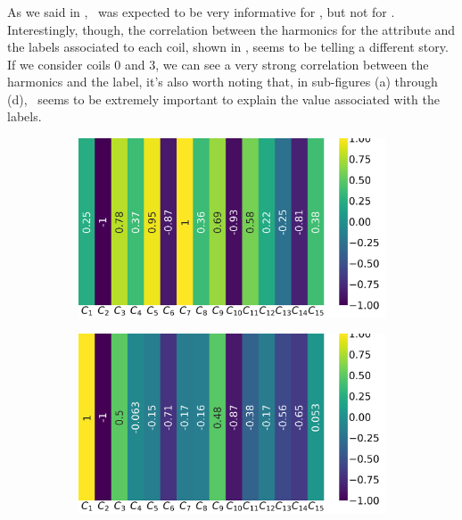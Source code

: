 \subsubsection{\cnmod}
As we said in , \cnmod\ was expected to be very informative for \qrp, but not for
\qlp. Interestingly, though, the correlation between the harmonics for the attribute and the labels
associated to each coil, shown in , seems to be telling a different story.
If we consider coils $0$ and $3$, we can see a very strong correlation between the harmonics and the
label, it's also worth noting that, in sub-figures (a) through (d), \cnmod[2]\ seems to be extremely
important to explain the value associated with the labels.
\begin{figure}[!ht]
	\centering
	\begin{subfigure}{0.49\linewidth}
		\includegraphics[width=\linewidth]{img/qlp_corr/Cnmod_coil0.png}
	\end{subfigure}
	\begin{subfigure}{0.49\linewidth}
		\includegraphics[width=\linewidth]{img/qlp_corr/Cnmod_coil1.png}

\end{subfigure}
\end{figure}
